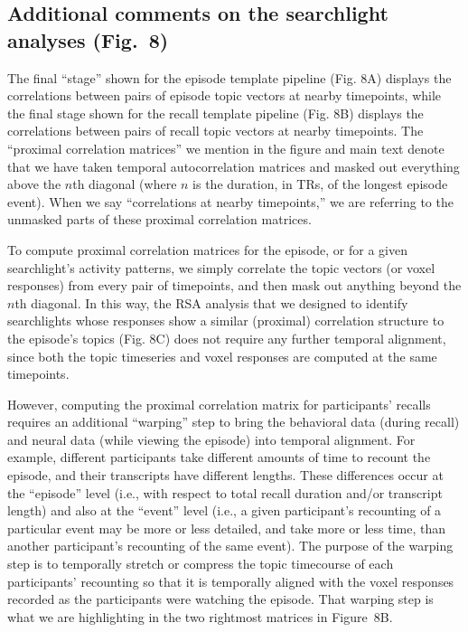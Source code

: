 \documentclass{article}
\newcommand{\brains}{8}
\begin{document}
\subsection*{Additional comments on the searchlight analyses (Fig.~\brains)}
The final ``stage'' shown for the episode template pipeline (Fig. \brains A) displays the correlations between pairs of episode topic vectors at nearby timepoints, while the final stage shown for the recall template pipeline (Fig. \brains B) displays the correlations between pairs of recall topic vectors at nearby timepoints.  The ``proximal correlation matrices'' we mention in the figure and main text denote that we have taken temporal autocorrelation matrices and masked out everything above the $n$th diagonal (where $n$ is the duration, in TRs, of the longest episode event).  When we say ``correlations at nearby timepoints,'' we are referring to the unmasked parts of these proximal correlation matrices.

To compute proximal correlation matrices for the episode, or for a given searchlight’s activity patterns, we simply correlate the topic vectors (or voxel responses) from every pair of timepoints, and then mask out anything beyond the $n$th diagonal.  In this way, the RSA analysis that we designed to identify searchlights whose responses show a similar (proximal) correlation structure to the episode’s topics (Fig. \brains C) does not require any further temporal alignment, since both the topic timeseries and voxel responses are computed at the same timepoints.

However, computing the proximal correlation matrix for participants’ recalls requires an additional ``warping'' step to bring the behavioral data (during recall) and neural data (while viewing the episode) into temporal alignment.  For example, different participants take different amounts of time to recount the episode, and their transcripts have different lengths.  These differences occur at the ``episode'' level (i.e., with respect to total recall duration and/or transcript length) and also at the ``event'' level (i.e., a given participant's recounting of a particular event may be more or less detailed, and take more or less time, than another participant's recounting of the same event).  The purpose of the warping step is to temporally stretch or compress the topic timecourse of each participants’ recounting so that it is temporally aligned with the voxel responses recorded as the participants were watching the episode.  That warping step is what we are highlighting in the two rightmost matrices in Figure~\brains B.
\end{document}
